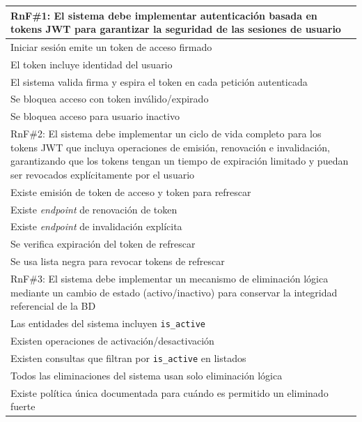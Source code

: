 \begin{addendum}
\begin{longtable}{|p{10cm}|p{3cm}|}
		\multicolumn{2}{|p{13cm}|}{\ac{RnF}\#1: El sistema debe implementar autenticación basada en tokens \ac{JWT} para garantizar la seguridad de las sesiones de usuario} \\
		\hline
		Iniciar sesión emite un token de acceso firmado & \checkmark \\
		\hline
		El token incluye identidad del usuario & \checkmark \\
		\hline
		El sistema valida firma y espira el token en cada petición autenticada & \checkmark \\
		\hline
		Se bloquea acceso con token inválido/expirado & \checkmark \\
		\hline
		Se bloquea acceso para usuario inactivo & \checkmark \\
		\hline
		\multicolumn{2}{|p{13cm}|}{\ac{RnF}\#2: El sistema debe implementar un ciclo de vida completo para los tokens \ac{JWT} que incluya operaciones de emisión, 
			renovación e invalidación, garantizando que los tokens tengan un tiempo de expiración limitado y puedan ser 
			revocados explícitamente por el usuario} \\
		\hline
		Existe emisión de token de acceso y token para refrescar & \checkmark \\
		\hline
		Existe \textit{endpoint} de renovación de token & \checkmark \\
		\hline
		Existe \textit{endpoint} de invalidación explícita & \checkmark \\
		\hline
		Se verifica expiración del token de refrescar & \checkmark \\
		\hline
		Se usa lista negra para revocar tokens de refrescar & \checkmark \\
		\hline
		\multicolumn{2}{|p{13cm}|}{\ac{RnF}\#3: El sistema debe implementar un mecanismo de eliminación lógica mediante 
			un cambio de estado (activo/inactivo)  para conservar la integridad referencial de la 
			\ac{BD}} \\
		\hline
		Las entidades del sistema incluyen \texttt{is\_active} & \checkmark \\
		\hline
		Existen operaciones de activación/desactivación & \checkmark \\
		\hline
		Existen consultas que filtran por \texttt{is\_active} en listados & \checkmark \\
		\hline
		Todos las eliminaciones del sistema usan solo eliminación lógica & \checkmark \\
		\hline
		Existe política única documentada para cuándo es permitido un eliminado fuerte & \checkmark \\

\end{longtable}
\end{addendum}
